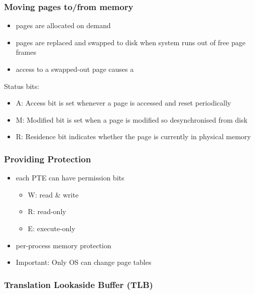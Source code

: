 \documentclass{article}
\begin{document}
\subsubsection{Moving pages to/from memory}

\begin{itemize}
	\item pages are allocated on demand 
	\item pages are replaced and swapped to disk when system runs out of free page frames
	\item access to a swapped-out page causes a 
\end{itemize}
Status bits:
\begin{itemize}
	\item A: Access bit is set whenever a page is accessed and reset periodically
	\item M: Modified bit is set when a page is modified so desynchronised from disk
	\item R: Residence bit indicates whether the page is currently in physical memory
\end{itemize}

\subsubsection{Providing Protection}

\begin{itemize}
	\item each PTE can have permission bits \begin{itemize}
		\item W: read \& write
		\item R: read-only
		\item E: execute-only
	\end{itemize}
	\item per-process memory protection
	\item Important: Only OS can change page tables
\end{itemize}

\subsubsection{Translation Lookaside Buffer (TLB)}
\end{document}
